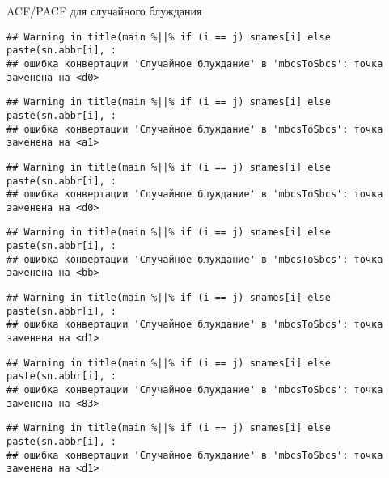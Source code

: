 \documentclass[
]{article}
\newenvironment{Shaded}{\begin{snugshade}}{\end{snugshade}}
\newcommand{\AttributeTok}[1]{\textcolor[rgb]{0.13,0.29,0.53}{#1}}
\newcommand{\DecValTok}[1]{\textcolor[rgb]{0.00,0.00,0.81}{#1}}
\newcommand{\FunctionTok}[1]{\textcolor[rgb]{0.13,0.29,0.53}{\textbf{#1}}}
\newcommand{\NormalTok}[1]{#1}
\newcommand{\SpecialCharTok}[1]{\textcolor[rgb]{0.81,0.36,0.00}{\textbf{#1}}}
\newcommand{\StringTok}[1]{\textcolor[rgb]{0.31,0.60,0.02}{#1}}
\begin{document}
ACF/PACF для случайного блуждания

\begin{Shaded}
\end{Shaded}

\begin{verbatim}
## Warning in title(main %||% if (i == j) snames[i] else paste(sn.abbr[i], :
## ошибка конвертации 'Случайное блуждание' в 'mbcsToSbcs': точка заменена на <d0>
\end{verbatim}

\begin{verbatim}
## Warning in title(main %||% if (i == j) snames[i] else paste(sn.abbr[i], :
## ошибка конвертации 'Случайное блуждание' в 'mbcsToSbcs': точка заменена на <a1>
\end{verbatim}

\begin{verbatim}
## Warning in title(main %||% if (i == j) snames[i] else paste(sn.abbr[i], :
## ошибка конвертации 'Случайное блуждание' в 'mbcsToSbcs': точка заменена на <d0>
\end{verbatim}

\begin{verbatim}
## Warning in title(main %||% if (i == j) snames[i] else paste(sn.abbr[i], :
## ошибка конвертации 'Случайное блуждание' в 'mbcsToSbcs': точка заменена на <bb>
\end{verbatim}

\begin{verbatim}
## Warning in title(main %||% if (i == j) snames[i] else paste(sn.abbr[i], :
## ошибка конвертации 'Случайное блуждание' в 'mbcsToSbcs': точка заменена на <d1>
\end{verbatim}

\begin{verbatim}
## Warning in title(main %||% if (i == j) snames[i] else paste(sn.abbr[i], :
## ошибка конвертации 'Случайное блуждание' в 'mbcsToSbcs': точка заменена на <83>
\end{verbatim}

\begin{verbatim}
## Warning in title(main %||% if (i == j) snames[i] else paste(sn.abbr[i], :
## ошибка конвертации 'Случайное блуждание' в 'mbcsToSbcs': точка заменена на <d1>
\end{verbatim}
\end{document}
